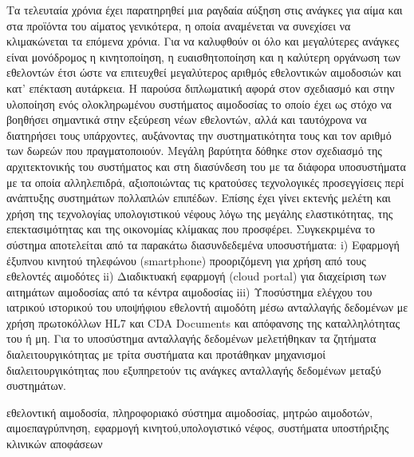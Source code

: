 \begin{abstractgr}
	Τα τελευταία χρόνια έχει παρατηρηθεί μια ραγδαία αύξηση στις ανάγκες για αίμα και στα προϊόντα του αίματος γενικότερα, η οποία αναμένεται να συνεχίσει να κλιμακώνεται τα επόμενα χρόνια. Για να καλυφθούν οι όλο και μεγαλύτερες ανάγκες είναι μονόδρομος η κινητοποίηση, η ευαισθητοποίηση και η καλύτερη οργάνωση των εθελοντών έτσι ώστε να επιτευχθεί μεγαλύτερος αριθμός εθελοντικών αιμοδοσιών και κατ' επέκταση αυτάρκεια. Η παρούσα διπλωματική αφορά στον σχεδιασμό και στην υλοποίηση ενός ολοκληρωμένου συστήματος αιμοδοσίας το οποίο έχει ως στόχο να βοηθήσει σημαντικά στην εξεύρεση νέων εθελοντών, αλλά και ταυτόχρονα να διατηρήσει τους υπάρχοντες, αυξάνοντας την συστηματικότητα τους και τον αριθμό των δωρεών που πραγματοποιούν. Μεγάλη βαρύτητα δόθηκε στον σχεδιασμό της αρχιτεκτονικής του συστήματος και στη διασύνδεση του με τα διάφορα υποσυστήματα με τα οποία αλληλεπιδρά, αξιοποιώντας τις κρατούσες τεχνολογικές προσεγγίσεις περί ανάπτυξης συστημάτων πολλαπλών επιπέδων. Επίσης έχει γίνει εκτενής μελέτη και χρήση της τεχνολογίας υπολογιστικού νέφους λόγω της μεγάλης ελαστικότητας, της επεκτασιμότητας και της οικονομίας κλίμακας που προσφέρει.  Συγκεκριμένα το σύστημα αποτελείται από τα παρακάτω διασυνδεδεμένα υποσυστήματα: i) Εφαρμογή έξυπνου κινητού τηλεφώνου (smartphone) προοριζόμενη για χρήση από τους εθελοντές αιμοδότες ii) Διαδικτυακή εφαρμογή (cloud portal) για διαχείριση των αιτημάτων αιμοδοσίας από τα κέντρα αιμοδοσίας  iii) Υποσύστημα ελέγχου του ιατρικού ιστορικού  του υποψήφιου εθελοντή αιμοδότη μέσω ανταλλαγής δεδομένων με χρήση πρωτοκόλλων HL7 και CDA Documents και απόφανσης της καταλληλότητας του ή μη. Για το υποσύστημα ανταλλαγής δεδομένων μελετήθηκαν τα ζητήματα διαλειτουργικότητας με τρίτα συστήματα και προτάθηκαν μηχανισμοί διαλειτουργικότητας που εξυπηρετούν τις ανάγκες ανταλλαγής δεδομένων μεταξύ συστημάτων.
    \begin{keywordsgr}
		εθελοντική αιμοδοσία, πληροφοριακό σύστημα αιμοδοσίας, μητρώο αιμοδοτών, αιμοεπαγρύπνηση, εφαρμογή κινητού,υπολογιστικό νέφος, συστήματα υποστήριξης κλινικών αποφάσεων
	\end{keywordsgr}
\end{abstractgr}

